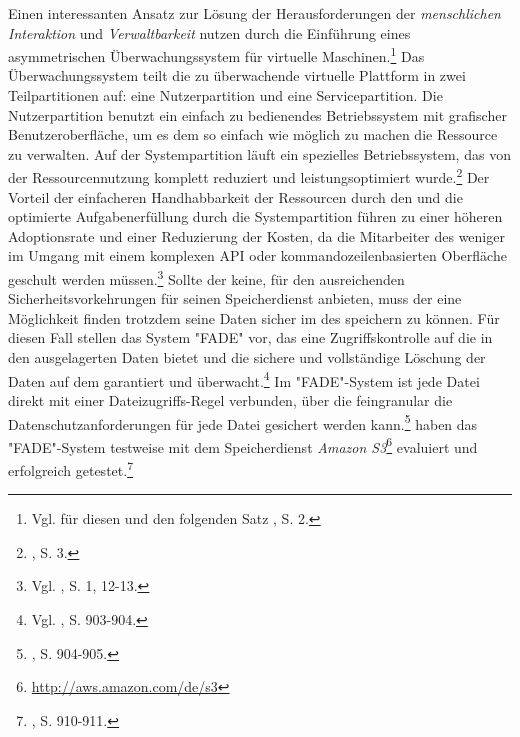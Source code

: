 \newline
\newline
Einen interessanten Ansatz zur Lösung der Herausforderungen der \emph{menschlichen Interaktion} und \emph{Verwaltbarkeit} nutzen \cite{Zhou.2012} durch die Einführung eines asymmetrischen Überwachungssystem für virtuelle Maschinen.\footnote{Vgl. für diesen und den folgenden Satz \cite{Zhou.2012}, S. 2.}
Das Überwachungssystem teilt die zu überwachende virtuelle Plattform in zwei Teilpartitionen auf: eine Nutzerpartition und eine Servicepartition.
Die Nutzerpartition benutzt ein einfach zu bedienendes Betriebssystem mit grafischer Benutzeroberfläche, um es dem \CSU so einfach wie möglich zu machen die Ressource zu verwalten. Auf der Systempartition läuft ein spezielles Betriebssystem, das von der Ressourcennutzung komplett reduziert und leistungsoptimiert wurde.\footnote{\cite{Zhou.2012}, S. 3.}
Der Vorteil der einfacheren Handhabbarkeit der Ressourcen durch den \CSU und die optimierte Aufgabenerfüllung durch die Systempartition führen zu einer höheren Adoptionsrate und einer Reduzierung der Kosten, da die Mitarbeiter des \CSUs weniger im Umgang mit einem komplexen API oder kommandozeilenbasierten Oberfläche geschult werden müssen.\footnote{Vgl. \cite{Zhou.2012}, S. 1, 12-13.}
\newline
Sollte der \CSP keine, für den \CSUComma ausreichenden Sicherheitsvorkehrungen für seinen \CC Speicherdienst anbieten, muss der \CSU eine Möglichkeit finden trotzdem seine Daten sicher im \CS des \CSP speichern zu können. 
Für diesen Fall stellen \cite{Tang.2012} das System "FADE" vor, das eine Zugriffskontrolle auf die in den \CS ausgelagerten Daten bietet und die sichere und vollständige Löschung der Daten auf dem \CS garantiert und überwacht.\footnote{Vgl. \cite{Tang.2012}, S. 903-904.}
Im "FADE"-System ist jede Datei direkt mit einer Dateizugriffs-Regel verbunden, über die feingranular die Datenschutzanforderungen für jede Datei gesichert werden kann.\footnote{\cite{Tang.2012}, S. 904-905.}
\cite{Tang.2012} haben das "FADE"-System testweise mit dem \CC Speicherdienst \emph{Amazon \acs{S3}}\footnote{\url{http://aws.amazon.com/de/s3}} evaluiert und erfolgreich getestet.\footnote{\cite{Tang.2012}, S. 910-911.} 

%
%

